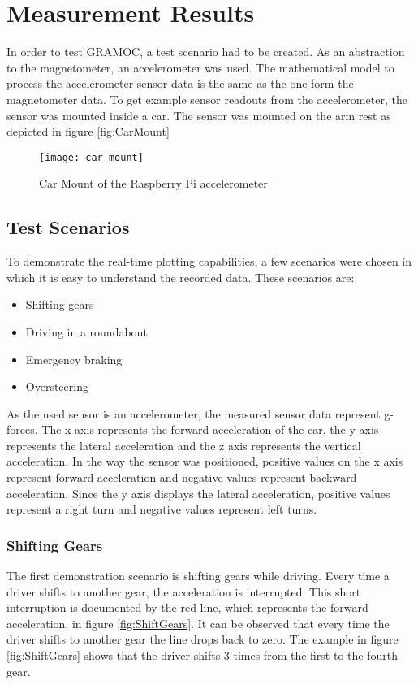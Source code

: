 \chapter{Measurement Results}
\label{ch:MeasureRes}

\author{Nico Leidenfrost}
%
In order to test GRAMOC, a test scenario had to be created. As an abstraction to the magnetometer, an accelerometer was used. The mathematical model to process the accelerometer sensor data is the same as the one form the magnetometer data. To get example sensor readouts from the accelerometer, the sensor was mounted inside a car. The sensor was mounted on the arm rest as depicted in figure \vref{fig:CarMount}

\begin{figure}[H]
    \centering
    \texttt{[image: car\_mount]}
    \caption{Car Mount of the Raspberry Pi accelerometer}
    \label{fig:CarMount}
\end{figure}

\section{Test Scenarios}
To demonstrate the real-time plotting capabilities, a few scenarios were chosen in which it is easy to understand the recorded data. These scenarios are:

\begin{itemize}
    \item Shifting gears
    \item Driving in a roundabout
    \item Emergency braking
    \item Oversteering
\end{itemize}

As the used sensor is an accelerometer, the measured sensor data represent g-forces. The x axis represents the forward acceleration of the car, the y axis represents the lateral acceleration and the z axis represents the vertical acceleration. In the way the sensor was positioned, positive values on the x axis represent forward acceleration and negative values represent backward acceleration. Since the y axis displays the lateral acceleration, positive values represent a right turn and negative values represent left turns.

\subsection{Shifting Gears}
The first demonstration scenario is shifting gears while driving. Every time a driver shifts to another gear, the acceleration is interrupted. This short interruption is documented by the red line, which represents the forward acceleration, in figure \vref{fig:ShiftGears}. It can be observed that every time the driver shifts to another gear the line drops back to zero. The example in figure \vref{fig:ShiftGears} shows that the driver shifts 3 times from the first to the fourth gear.

